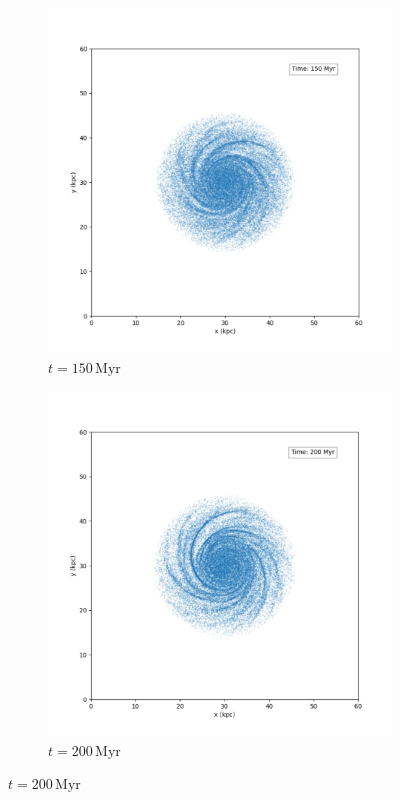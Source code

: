 \begin{figure}[H]
    \vspace{0.2cm}

    \begin{subfigure}[b]{0.45\textwidth}
        \centering
        \includegraphics[width=\textwidth]{chapters/results/img/p3m-galaxy/150myr.png}
        \caption{$t=150\,\text{Myr}$}
        \label{fig:spiral-galaxy-evolution-p3m-sub3}
    \end{subfigure}
    \hfill
    \begin{subfigure}[b]{0.45\textwidth}
        \centering
        \includegraphics[width=\textwidth]{chapters/results/img/p3m-galaxy/200myr.png}
        \caption{$t=200\,\text{Myr}$}
        \label{fig:spiral-galaxy-evolution-p3m-sub4}
    \end{subfigure}


\end{figure}

